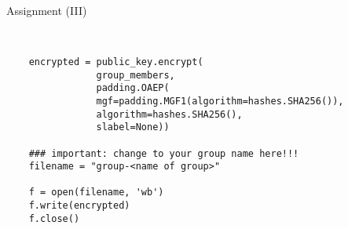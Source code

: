 \begin{frame}[fragile]{Assignment (III)}
	
	\begin{verbatim}
	
	
	encrypted = public_key.encrypt(
                group_members,
                padding.OAEP(
                mgf=padding.MGF1(algorithm=hashes.SHA256()),
                algorithm=hashes.SHA256(),
                slabel=None))
	
	### important: change to your group name here!!!
	filename = "group-<name of group>"
	
	f = open(filename, 'wb')
	f.write(encrypted)
	f.close()
	\end{verbatim}
	
	\end{frame}


